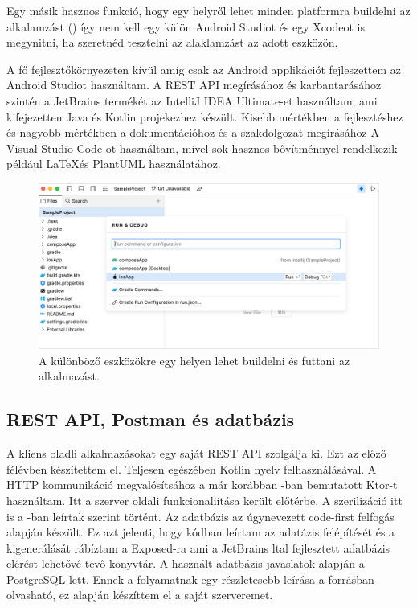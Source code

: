 Egy másik hasznos funkció, hogy egy helyről lehet minden platformra buildelni az alkalamzást () így nem kell egy külön Android Studiot és egy Xcodeot is megynitni, ha szeretnéd tesztelni az alaklamzást az adott eszközön.

A fő fejlesztőkörnyezeten kívül amíg csak az Android applikációt fejleszettem az Android Studiot használtam.
A REST API megírásához és karbantarásához szintén a JetBrains termékét az IntelliJ IDEA Ultimate-et használtam, ami kifejezetten Java és Kotlin projekezhez készült.
Kisebb mértékben a fejlesztéshez és nagyobb mértékben a dokumentációhoz és a szakdolgozat megírásához A Visual Studio Code-ot használtam, mivel sok hasznos bővítménnyel rendelkezik például \LaTeX és PlantUML használatához.


\begin{figure}[!ht]
    \centering
    \includegraphics[width=150mm, keepaspectratio]{figures/fleet-run-configurations.png}
    \caption{A különböző eszközökre egy helyen lehet buildelni és futtani az alkalmazást. \cite{Fleet}}
    \label{fig:RunConfigs}
\end{figure}




\subsection{REST API, Postman és adatbázis}

A kliens oladli alkalmazásokat egy saját REST API szolgálja ki.
Ezt az előző félévben készítettem el. Teljesen egészében Kotlin nyelv felhasználásával. A HTTP kommunikáció megvalósítsához a már korábban -ban bemutatott Ktor-t használtam.
Itt a szerver oldali funkcionaliítása került előtérbe. A szerilizáció itt is a -ban leírtak szerint történt.
Az adatbázis az úgynevezett code-first felfogás alapján készült. Ez azt jelenti, hogy kódban leírtam az adatázis felépítését és a kigenerálását rábíztam a Exposed-ra ami a JetBrains ltal fejlesztett adatbázis elérést lehetővé tevő könyvtár.
A használt adatbázis javaslatok alapján a PostgreSQL lett.
Ennek a folyamatnak egy részletesebb leírása a \cite{Backend} forrásban olvasható, ez alapján készíttem el a saját szerveremet.

